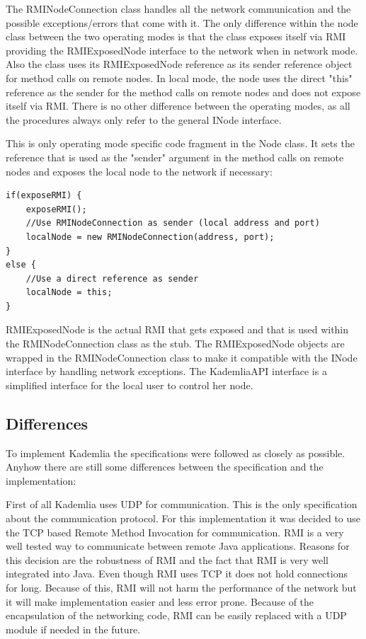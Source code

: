 \documentclass[a4paper, 12pt]{article} %
\begin{document}
The RMINodeConnection class handles all the network communication and the possible exceptions/errors that come with it. The only difference within the node class between the two operating modes is that the class exposes itself via RMI providing the RMIExposedNode interface to the network when in network mode. Also the class uses its RMIExposedNode reference as its sender reference object for method calls on remote nodes. In local mode, the node uses the direct "this" reference as the sender for the method calls on remote nodes and does not expose itself via RMI. There is no other difference between the operating modes, as all the procedures always only refer to the general INode interface.

This is only operating mode specific code fragment in the Node class. It sets the reference that is used as the "sender" argument in the method calls on remote nodes and exposes the local node to the network if necessary:

\begin{verbatim}
if(exposeRMI) {
    exposeRMI();
    //Use RMINodeConnection as sender (local address and port)
    localNode = new RMINodeConnection(address, port); 
}
else {
    //Use a direct reference as sender
    localNode = this;
}
\end{verbatim}

RMIExposedNode is the actual RMI that gets exposed and that is used within the RMINodeConnection class as the stub. The RMIExposedNode objects are wrapped in the RMINodeConnection class to make it compatible with the INode interface by handling network exceptions. The KademliaAPI interface is a simplified interface for the local user to control her node.

\subsection{Differences}

To implement Kademlia the specifications were followed as closely as possible. Anyhow there are still some differences between the specification and the implementation:

First of all Kademlia uses UDP for communication. This is the only specification about the communication protocol. For this implementation it was decided to use the TCP based Remote Method Invocation for communication. RMI is a very well tested way to communicate between remote Java applications. Reasons for this decision are the robustness of RMI and the fact that RMI is very well integrated into Java. Even though RMI uses TCP it does not hold connections for long. Because of this, RMI will not harm the performance of the network but it will make implementation easier and less error prone. Because of the encapsulation of the networking code, RMI can be easily replaced with a UDP module if needed in the future.
\end{document}
